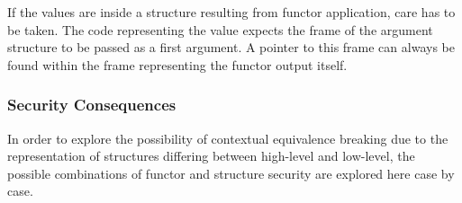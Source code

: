 \documentclass[10pt,a4paper,master=cws, masteroption=ai,english,inputenc=utf8]{kulemt}
\begin{document}
If the values are inside a structure resulting from functor application, care has to be taken.
The code representing the value expects the frame of the argument structure to be passed as a first argument.
A pointer to this frame can always be found within the frame representing the functor output itself.

\subsubsection{Security Consequences}

In order to explore the possibility of contextual equivalence breaking due to the representation of structures differing between high-level and low-level, the possible combinations of functor and structure security are explored here case by case.
\end{document}
